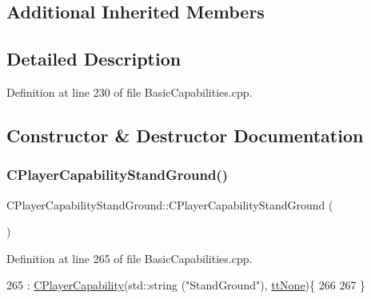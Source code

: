 \subsection*{Additional Inherited Members}


\subsection{Detailed Description}


Definition at line 230 of file Basic\+Capabilities.\+cpp.



\subsection{Constructor \& Destructor Documentation}
\hypertarget{classCPlayerCapabilityStandGround_a58f0601edbe114a45ff27b84027afd09}{}\label{classCPlayerCapabilityStandGround_a58f0601edbe114a45ff27b84027afd09} 
\subsubsection{\texorpdfstring{C\+Player\+Capability\+Stand\+Ground()}{CPlayerCapabilityStandGround()}}
{\footnotesize\ttfamily C\+Player\+Capability\+Stand\+Ground\+::\+C\+Player\+Capability\+Stand\+Ground (\begin{DoxyParamCaption}{ }\end{DoxyParamCaption})\hspace{0.3cm}{\ttfamily [protected]}}



Definition at line 265 of file Basic\+Capabilities.\+cpp.


\begin{DoxyCode}
265                                                            : \hyperlink{classCPlayerCapability_a303de62aba5d3f65d9a8e013c64a96c1}{CPlayerCapability}(std::string
      (\textcolor{stringliteral}{"StandGround"}), \hyperlink{classCPlayerCapability_a9d3450ed1532fd536bd6cbb1e2eef02fac78f0e806a6b0ead030d63c27c9ce929}{ttNone})\{
266 
267 \}
\end{DoxyCode}
\hypertarget{classCPlayerCapabilityStandGround_aa09aba607953849ece673feeb27ef6fd}{}\label{classCPlayerCapabilityStandGround_aa09aba607953849ece673feeb27ef6fd} 
